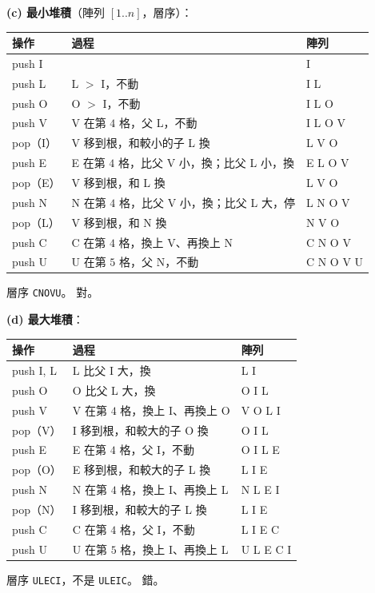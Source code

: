 \begin{pastsoln}
\textbf{(c) 最小堆積}（陣列 $[1..n]$，層序）：
\begin{center}
\small
\begin{tabular}{lll}
\toprule
操作 & 過程 & 陣列 \\
\midrule
push I & & I \\
push L & L $>$ I，不動 & I L \\
push O & O $>$ I，不動 & I L O \\
push V & V 在第 $4$ 格，父 L，不動 & I L O V \\
pop（I） & V 移到根，和較小的子 L 換 & L V O \\
push E & E 在第 $4$ 格，比父 V 小，換；比父 L 小，換 & E L O V \\
pop（E） & V 移到根，和 L 換 & L V O \\
push N & N 在第 $4$ 格，比父 V 小，換；比父 L 大，停 & L N O V \\
pop（L） & V 移到根，和 N 換 & N V O \\
push C & C 在第 $4$ 格，換上 V、再換上 N & C N O V \\
push U & U 在第 $5$ 格，父 N，不動 & C N O V U \\
\bottomrule
\end{tabular}
\end{center}
層序 \texttt{CNOVU}。 對。

\textbf{(d) 最大堆積}：
\begin{center}
\small
\begin{tabular}{lll}
\toprule
操作 & 過程 & 陣列 \\
\midrule
push I, L & L 比父 I 大，換 & L I \\
push O & O 比父 L 大，換 & O I L \\
push V & V 在第 $4$ 格，換上 I、再換上 O & V O L I \\
pop（V） & I 移到根，和較大的子 O 換 & O I L \\
push E & E 在第 $4$ 格，父 I，不動 & O I L E \\
pop（O） & E 移到根，和較大的子 L 換 & L I E \\
push N & N 在第 $4$ 格，換上 I、再換上 L & N L E I \\
pop（N） & I 移到根，和較大的子 L 換 & L I E \\
push C & C 在第 $4$ 格，父 I，不動 & L I E C \\
push U & U 在第 $5$ 格，換上 I、再換上 L & U L E C I \\
\bottomrule
\end{tabular}
\end{center}
層序 \texttt{ULECI}，不是 \texttt{ULEIC}。 錯。
\end{pastsoln}

